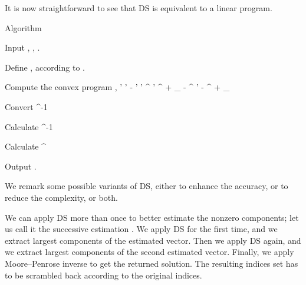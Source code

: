 \stopsubsection

\startsubsection [title={Linear Program}]

It is now straightforward to see that DS is equivalent to a linear program.

\Result
{Algorithm}
{
\startitemize[n]
\item Input , , .
%
\item Define , according to .
%
\item Compute the convex program
 {
\NC {}, 
\LA \NC \startcases
   \NC {}  \MC {} \NR
   \NC {} \;  \MC {}' \preceq {}' \NR
   \NC \MC - ' \preceq {}' \NR
   \NC \MC {}^\Adj {} ' \preceq {}^\Adj {} + \g_{}  \NR
   \NC \MC - ^\Adj {} ' \preceq - ^\Adj {} + \g_{}  \NR
\stopcases \NR
}
\item Convert
%
 {
\NC {}
\LA \NC {} ^{-1}  \NR
}
\item Calculate
%
 {
\NC {}
\LA \NC {}^{-1}  \NR
}
\item Calculate
%
 {
\NC {}
\LA \NC {}  ^\Adj \NR
}
\item Output .
\stopitemize
}

\stopsubsection

\startsection [title={Variants}]

We remark some possible variants of DS, either to enhance the accuracy, or to reduce the complexity, or both.

\startsubsection [title={Successive estimation of nonzero components}]

We can apply DS more than once to better estimate the nonzero components;
let us call it the successive estimation \cite {CaT07}.
We apply DS for the first time, and we extract largest components of the estimated vector.
Then we apply DS again, and we extract largest components of the second estimated vector.
Finally, we apply Moore–Penrose inverse to get the returned solution.
The resulting indices set has to be scrambled back according to the original indices.

